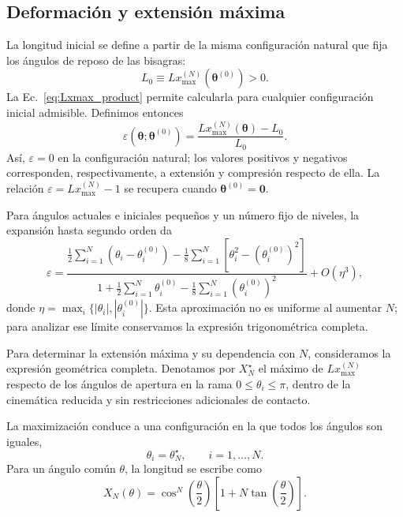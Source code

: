 \documentclass[11pt,a4paper]{article}
\begin{document}
\subsection{Deformación y extensión máxima}
\label{sec:strain_max}

La longitud inicial se define a partir de la misma configuración
natural que fija los ángulos de reposo de las bisagras:
\begin{equation}
L_0\equiv Lx_{\max}^{(N)}(\boldsymbol{\theta}^{(0)})>0.
\label{eq:L0_general}
\end{equation}
La Ec.~\eqref{eq:Lxmax_product} permite calcularla para cualquier
configuración inicial admisible. Definimos entonces
\begin{equation}
\boxed{
\varepsilon(\boldsymbol{\theta};\boldsymbol{\theta}^{(0)})
=\frac{Lx_{\max}^{(N)}(\boldsymbol{\theta})-L_0}{L_0}.
}
\label{eq:strain_def}
\end{equation}
Así, $\varepsilon=0$ en la configuración natural; los valores
positivos y negativos corresponden, respectivamente, a extensión
y compresión respecto de ella. La relación
$\varepsilon=Lx_{\max}^{(N)}-1$ se recupera cuando
$\boldsymbol{\theta}^{(0)}=\boldsymbol{0}$.

Para ángulos actuales e iniciales pequeños y un número fijo de
niveles, la expansión hasta segundo orden da
\begin{equation}
\varepsilon
=
\frac{
\frac12\sum_{i=1}^{N}(\theta_i-\theta_i^{(0)})
-\frac18\sum_{i=1}^{N}\left[\theta_i^2-(\theta_i^{(0)})^2\right]
}{
1+\frac12\sum_{i=1}^{N}\theta_i^{(0)}
-\frac18\sum_{i=1}^{N}(\theta_i^{(0)})^2
}
+O(\eta^3),
\label{eq:strain_small_angles}
\end{equation}
donde $\eta=\max_i\{|\theta_i|,|\theta_i^{(0)}|\}$.
Esta aproximación no es uniforme al aumentar $N$; para analizar
ese límite conservamos la expresión trigonométrica completa.

Para determinar la extensión máxima y su dependencia con $N$,
consideramos la expresión geométrica completa. Denotamos por
$X_N^\star$ el máximo de $Lx_{\max}^{(N)}$ respecto de los
ángulos de apertura en la rama $0\leq\theta_i\leq\pi$, dentro
de la cinemática reducida y sin restricciones adicionales de contacto.

La maximización conduce a una configuración en la que todos
los ángulos son iguales,
\begin{equation}
\theta_i=\theta_N^\star,
\qquad i=1,\ldots,N.
\end{equation}
Para un ángulo común $\theta$, la longitud se escribe como
\begin{equation}
X_N(\theta)
=
\cos^N\!\left(\frac{\theta}{2}\right)
\left[
1+N\tan\!\left(\frac{\theta}{2}\right)
\right].
\label{eq:length_equal_angles}
\end{equation}
\end{document}
